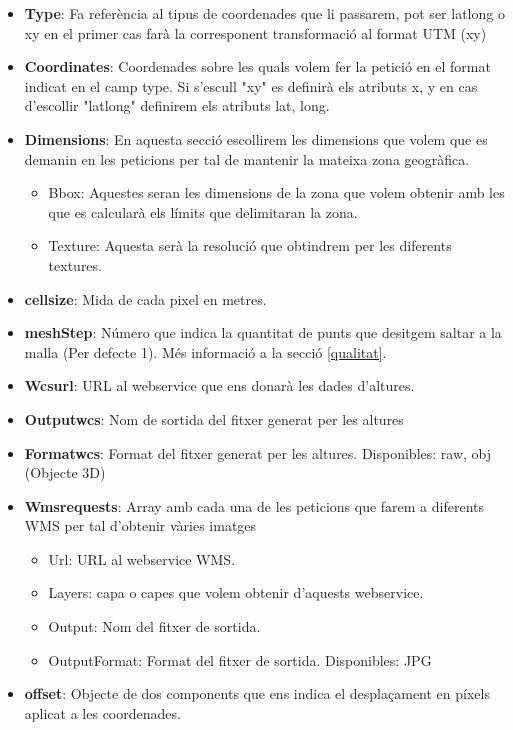 \documentclass[10pt,a4paper,twocolumn,twoside]{article}
\begin{document}
\begin{itemize}
  \item \textbf{Type}: Fa referència al tipus de coordenades que li passarem, pot ser latlong o xy en el primer cas farà la corresponent transformació al format UTM (xy)
  \item \textbf{Coordinates}: Coordenades sobre les quals volem fer la petició en el format indicat en el camp type. Si s'escull "xy" es definirà els atributs x, y en cas d'escollir "latlong" definirem els atributs lat, long.

  \item \textbf{Dimensions}: En aquesta secció escollirem les dimensions que volem que es demanin en les peticions per tal de mantenir la mateixa zona geogràfica.
  \begin{itemize}
    \item Bbox: Aquestes seran les dimensions de la zona que volem obtenir amb les que es calcularà els límits que delimitaran la zona.
    \item Texture: Aquesta serà la resolució que obtindrem per les diferents textures.
  \end{itemize}

  \item \textbf{cellsize}: Mida de cada pixel en metres.
  \item \textbf{meshStep}: Número que indica la quantitat de punts que desitgem saltar a la malla (Per defecte 1). Més informació a la secció \ref{qualitat}.
  \item \textbf{Wcsurl}: URL al webservice que ens donarà les dades d'altures.
  \item \textbf{Outputwcs}: Nom de sortida del fitxer generat per les altures
  \item \textbf{Formatwcs}: Format del fitxer generat per les altures. Disponibles: raw, obj (Objecte 3D)

  \item \textbf{Wmsrequests}: Array amb cada una de les peticions que farem a diferents WMS per tal d'obtenir vàries imatges
  \begin{itemize}
    \item Url: URL al webservice WMS.
    \item Layers: capa o capes que volem obtenir d'aquests webservice.
    \item Output: Nom del fitxer de sortida.
    \item OutputFormat: Format del fitxer de sortida. Disponibles: JPG
  \end{itemize}
  
  \item \textbf{offset}: Objecte de dos components que ens indica el desplaçament en píxels aplicat a les coordenades.
\end{itemize}
\end{document}
